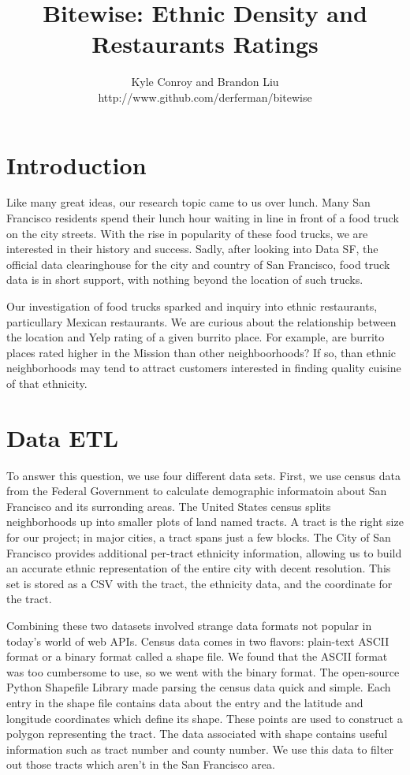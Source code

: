 \documentclass[11pt,twocolumn]{article}
\author{Kyle Conroy and Brandon Liu\\
http://www.github.com/derferman/bitewise}
\title{Bitewise: Ethnic Density and Restaurants Ratings}
\begin{document}
\maketitle

\section{Introduction}

Like many great ideas, our research topic came to us over lunch. Many San Francisco residents spend their lunch hour waiting in line in front of a food truck on the city streets. With the rise in popularity of these food trucks, we are interested in their history and success. Sadly, after looking into Data SF, the official data clearinghouse for the city and country of San Francisco, food truck data is in short support, with nothing beyond the location of such trucks.

Our investigation of food trucks sparked and inquiry into ethnic restaurants, particullary Mexican restaurants. We are curious about the relationship between the location and Yelp rating of a given burrito place. For example, are burrito places rated higher in the Mission than other neighboorhoods? If so, than ethnic neighborhoods may tend to attract customers interested in finding quality cuisine of that ethnicity.

\section{Data ETL}

To answer this question, we use four different data sets. First, we use census data from the Federal Government to calculate demographic informatoin about San Francisco and its surronding areas. The United States census splits neighborhoods up into smaller plots of land named tracts. A tract is the right size for our project; in major cities, a tract spans just a few blocks. The City of San Francisco provides additional per-tract ethnicity information, allowing us to build an accurate ethnic representation of the entire city with decent resolution. This set is stored as a CSV with the tract, the ethnicity data, and the coordinate for the tract.

Combining these two datasets involved strange data formats not popular in today's world of web APIs. Census data comes in two flavors: plain-text ASCII format or a binary format called a shape file. We found that the ASCII format was too cumbersome to use, so we went with the binary format. The open-source Python Shapefile Library made parsing the census data quick and simple. Each entry in the shape file contains data about the entry and the latitude and longitude coordinates which define its shape. These points are used to construct a polygon representing the tract. The data associated with shape contains useful information such as tract number and county number. We use this data to filter out those tracts which aren't in the San Francisco area.
\end{document}
